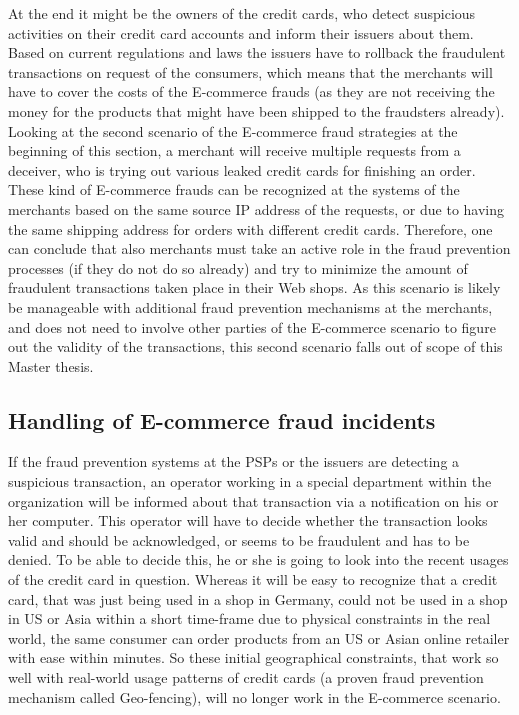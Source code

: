 At the end it might be the owners of the credit cards, who detect suspicious activities on their credit card accounts and inform their issuers about them. Based on current regulations and laws the issuers have to rollback the fraudulent transactions on request of the consumers, which means that the merchants will have to cover the costs of the \gls{E-commerce} frauds (as they are not receiving the money for the products that might have been shipped to the fraudsters already). \\

Looking at the second scenario of the \gls{E-commerce} fraud strategies at the beginning of this section, a merchant will receive multiple requests from a deceiver, who is trying out various leaked credit cards for finishing an order. These kind of \gls{E-commerce} frauds can be recognized at the systems of the merchants based on the same source \gls{IP} address of the requests, or due to having the same shipping address for orders with different credit cards. Therefore, one can conclude that also merchants must take an active role in the fraud prevention processes (if they do not do so already) and try to minimize the amount of fraudulent transactions taken place in their Web shops. As this scenario is likely be manageable with additional fraud prevention mechanisms at the merchants, and does not need to involve other parties of the \gls{E-commerce} scenario to figure out the validity of the transactions, this second scenario falls out of scope of this Master thesis.


\subsection{Handling of E-commerce fraud incidents}
\label{subsec:e_commerce_fraud_handling}

If the fraud prevention systems at the \gls{PSP}s or the issuers are detecting a suspicious transaction, an operator working in a special department within the organization will be informed about that transaction via a notification on his or her computer. This operator will have to decide whether the transaction looks valid and should be acknowledged, or seems to be fraudulent and has to be denied. To be able to decide this, he or she is going to look into the recent usages of the credit card in question. Whereas it will be easy to recognize that a credit card, that was just being used in a shop in Germany, could not be used in a shop in US or Asia within a short time-frame due to physical constraints in the real world, the same consumer can order products from an US or Asian online retailer with ease within minutes. So these initial geographical constraints, that work so well with real-world usage patterns of credit cards (a proven fraud prevention mechanism called Geo-fencing), will no longer work in the \gls{E-commerce} scenario. \\

